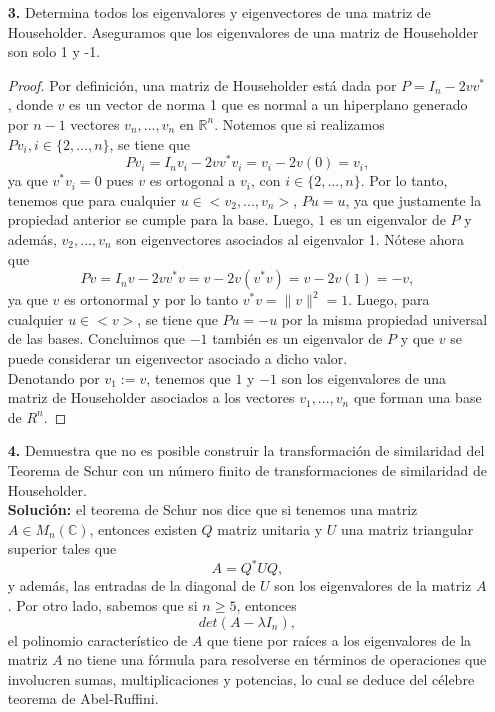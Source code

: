 \documentclass[letterpaper]{article}
\newcommand{\R}{\mathbb{R}}
\newcommand{\C}{\mathbb{C}}
\newcommand{\1}{\mathds{1}}
\theoremstyle{definition}
\theoremstyle{definition}
\theoremstyle{definition}
\theoremstyle{definition}
\theoremstyle{definition}
\begin{document}
\begin{enumerate}
    \item[\textbf{3.}]Determina todos los eigenvalores y eigenvectores de una matriz de Householder.
    Aseguramos que los eigenvalores de una matriz de Householder son solo 1 y -1.
    \begin{proof} 
       Por definición, una matriz de Householder está dada por $P=I_n-2vv^*$, donde $v$ es un vector de norma 1 que es normal 
       a un hiperplano generado por $n-1$ vectores $v_n,...,v_n$ en $\R^n$. Notemos que si realizamos $Pv_i, i\in \{2,...,n\}$,
       se tiene que
       \[
       Pv_i=I_nv_i-2vv^*v_i=v_i-2v(0)=v_i, 
       \]  
       ya que $v^*v_i=0$ pues $v$ es ortogonal a $v_i$, con $i\in \{2,...,n\}$. Por lo tanto, tenemos que para cualquier 
       $u\in <v_2,...,v_n>$, $Pu=u$, ya que justamente la propiedad anterior se cumple para la base. Luego, $1$ es un eigenvalor
       de $P$ y además, $v_2,...,v_n$ son eigenvectores asociados al eigenvalor 1. Nótese ahora que 
       \[
        Pv=I_nv-2vv^*v=v-2v(v^*v)=v-2v(1)=-v,
       \]
       ya que $v$ es ortonormal y por lo tanto $v^*v=\|v\|^2=1$. Luego, para cualquier $u\in <v>$, se tiene que $Pu=-u$ por la misma 
       propiedad universal de las bases. Concluimos que $-1$ también es un eigenvalor de $P$ y que $v$ se puede considerar 
       un eigenvector asociado a dicho valor.\\

       Denotando por $v_1:=v$, tenemos que $1$ y $-1$ son los eigenvalores de una matriz de Householder asociados a 
       los vectores $v_1,...,v_n$ que forman una base de $R^n$.
     \end{proof}
    \item[\textbf{4.}]Demuestra que no es posible construir la transformación de similaridad del Teorema
    de Schur con un número finito de transformaciones de similaridad de Householder.\\

    \textbf{Solución:} el teorema de Schur nos dice que si tenemos una matriz $A\in M_n(\C)$, entonces existen $Q$ matriz unitaria
    y $U$ una matriz triangular superior tales que 
    \[
    A=Q^*UQ,    
    \]
    y además, las entradas de la diagonal de $U$ son los eigenvalores de la matriz $A$. Por otro lado, sabemos que si $n\geq5$, entonces 
    \[
    det(A-\lambda I_n),
    \]
    el polinomio característico de $A$ que tiene por raíces a los eigenvalores de la matriz $A$ no tiene una fórmula  
    para resolverse en términos de operaciones que involucren sumas, multiplicaciones y potencias, lo cual
    se deduce del célebre teorema de Abel-Ruffini.\\


\end{enumerate}
\end{document}
